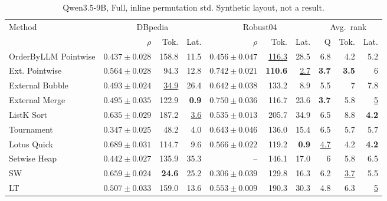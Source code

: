 \begin{table}[t]
\centering\footnotesize\setlength{\tabcolsep}{3.2pt}\renewcommand{\arraystretch}{1.12}
\caption{Qwen3.5-9B, Full, inline permutation std. Synthetic layout, not a result.}
\begin{tabular}{@{}lrrrrrrrrr@{}}
\toprule
Method & \multicolumn{3}{c}{DBpedia} & \multicolumn{3}{c}{Robust04} & \multicolumn{3}{c}{Avg.\ rank} \\
\cmidrule(lr){2-4} \cmidrule(lr){5-7} \cmidrule(lr){8-10}
 & $\rho$ & Tok. & Lat. & $\rho$ & Tok. & Lat. & Q & Tok. & Lat. \\
\midrule
OrderByLLM Pointwise & $0.437\pm0.028$ & 158.8 & 11.5 & $0.456\pm0.047$ & \underline{116.3} & 28.5 & 6.8 & 4.2 & 5.2 \\
Ext. Pointwise & $0.564\pm0.028$ & 94.3 & 12.8 & \underline{$0.742\pm0.021$} & \textbf{110.6} & \underline{2.7} & \textbf{3.7} & \textbf{3.5} & 6 \\
External Bubble & $0.493\pm0.024$ & \underline{34.9} & 26.4 & $0.642\pm0.038$ & 133.2 & 8.9 & 5.5 & 7 & 7.8 \\
External Merge & $0.495\pm0.035$ & 122.9 & \textbf{0.9} & \textbf{$0.750\pm0.036$} & 116.7 & 23.6 & \textbf{3.7} & 5.8 & \underline{5} \\
ListK Sort & $0.635\pm0.029$ & 187.2 & \underline{3.6} & $0.535\pm0.013$ & 205.7 & 34.9 & 6.5 & 8.8 & \textbf{4.2} \\
Tournament & $0.347\pm0.025$ & 48.2 & 4.0 & $0.643\pm0.046$ & 136.0 & 15.4 & 6.5 & 5.7 & 5.7 \\
Lotus Quick & \textbf{$0.689\pm0.031$} & 114.7 & 9.6 & $0.566\pm0.022$ & 119.2 & \textbf{0.9} & \underline{4.7} & 4.2 & \textbf{4.2} \\
Setwise Heap & $0.442\pm0.027$ & 135.9 & 35.3 & -- & 146.1 & 17.0 & 6 & 5.8 & 6.5 \\
SW & \underline{$0.659\pm0.024$} & \textbf{24.6} & 25.2 & $0.306\pm0.039$ & 129.8 & 16.3 & 6.2 & \underline{3.7} & 5.5 \\
LT & $0.507\pm0.033$ & 159.0 & 13.6 & $0.553\pm0.009$ & 190.3 & 30.3 & 4.8 & 6.3 & \underline{5} \\
\bottomrule
\end{tabular}
\end{table}

